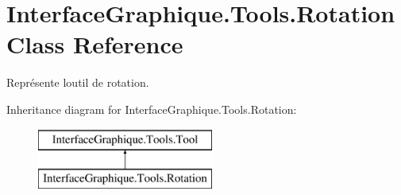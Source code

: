 \hypertarget{class_interface_graphique_1_1_tools_1_1_rotation}{}\section{Interface\+Graphique.\+Tools.\+Rotation Class Reference}
\label{class_interface_graphique_1_1_tools_1_1_rotation}


Représente l\textquotesingle{}outil de rotation.  


Inheritance diagram for Interface\+Graphique.\+Tools.\+Rotation\+:\begin{figure}[H]
\begin{center}
\leavevmode
\includegraphics[height=2.000000cm]{class_interface_graphique_1_1_tools_1_1_rotation}
\end{center}
\end{figure}
